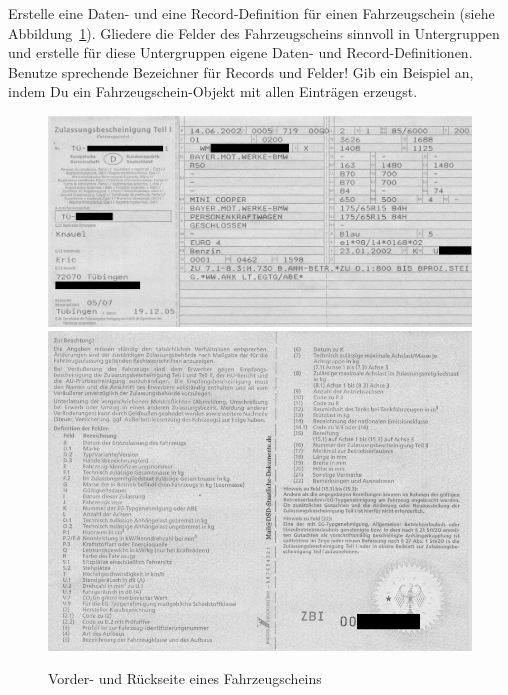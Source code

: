 \begin{aufgabe}

  Erstelle eine Daten- und eine Record-Definition für einen
    Fahrzeugschein (siehe Abbildung~\ref{fig:fahrzeugschein}).  Gliedere die Felder des
    Fahrzeugscheins sinnvoll in Untergruppen und erstelle für diese
    Untergruppen eigene Daten- und Record-Definitionen.  Benutze
    sprechende Bezeichner für Records und Felder!  Gib ein
    Beispiel an, indem Du ein Fahrzeugschein-Objekt mit allen Einträgen
    erzeugst.
    
    
    \begin{figure}[tb]
      \begin{center}
        \includegraphics[width=\linewidth]{i1zus/kfzschein-front}\\
        \medskip
        \includegraphics[width=\linewidth]{i1zus/kfzschein-back}
      \end{center}
      \caption{Vorder- und Rückseite eines Fahrzeugscheins}
      \label{fig:fahrzeugschein}
    \end{figure}
\end{aufgabe}

